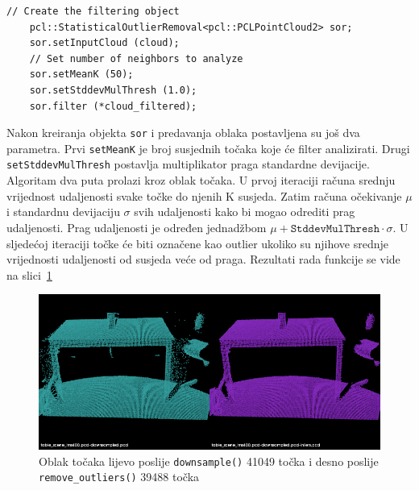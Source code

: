 \begin{lstlisting}[label=lstUklanjanje, caption={Dio izvornog koda za 
    uklanjanje odudarajaućih vrijednosti iz funkcije \texttt{remove\_outliers()} }]
    // Create the filtering object
    pcl::StatisticalOutlierRemoval<pcl::PCLPointCloud2> sor;
    sor.setInputCloud (cloud);
    // Set number of neighbors to analyze
    sor.setMeanK (50);
    sor.setStddevMulThresh (1.0);
    sor.filter (*cloud_filtered);
\end{lstlisting}

Nakon kreiranja objekta \texttt{sor} i predavanja oblaka postavljena su
još dva parametra. Prvi \texttt{setMeanK} je broj susjednih točaka koje
će filter analizirati. Drugi \texttt{setStddevMulThresh} postavlja
multiplikator praga standardne devijacije. Algoritam dva puta prolazi
kroz oblak točaka. U prvoj iteraciji računa srednju vrijednost
udaljenosti svake točke do njenih K susjeda. Zatim računa očekivanje
\(\mu\) i standardnu devijaciju \(\sigma\) svih udaljenosti kako bi
mogao odrediti prag udaljenosti. Prag udaljenosti je određen jednadžbom
\(\mu+\texttt{StddevMulThresh}\cdot\sigma\). U sljedećoj iteraciji točke
će biti označene kao outlier ukoliko su njihove srednje vrijednosti
udaljenosti od susjeda veće od praga. Rezultati rada funkcije se vide na
slici~\ref{fig:tablescene-outliers}
 
\begin{figure}[h]
\centering
\includegraphics[scale=0.5]{figures/tablescene-remove-outliers-example.png}
\caption{Oblak točaka lijevo poslije \texttt{downsample()} 41049 točka i desno poslije
\texttt{remove\_outliers()} 39488 točka }
\label{fig:tablescene-outliers}
\end{figure}

